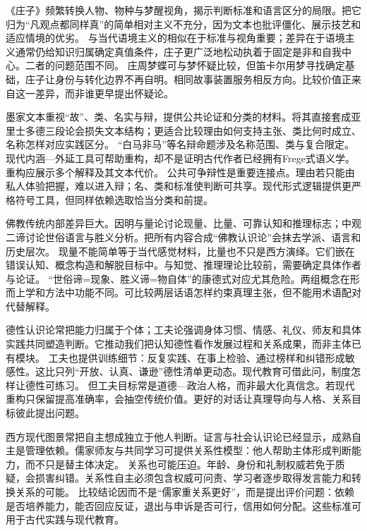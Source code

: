 《庄子》频繁转换人物、物种与梦醒视角，揭示判断标准和语言区分的局限\parencite{zhuangzi2009}。把它归为“凡观点都同样真”的简单相对主义不充分，因为文本也批评僵化、展示技艺和适应情境的优劣。 与当代语境主义的相似在于标准与视角重要；差异在于语境主义通常仍给知识归属确定真值条件，庄子更广泛地松动执着于固定是非和自我中心。二者的问题范围不同。 庄周梦蝶可与梦怀疑比较，但笛卡尔用梦寻找确定基础，庄子让身份与转化边界不再自明。相同故事装置服务相反方向。比较价值正来自这一差异，而非谁更早提出怀疑论。

墨家文本重视“故”、类、名实与辩，提供公共论证和分类的材料。将其直接套成亚里士多德三段论会损失文本结构；更适合比较理由如何支持主张、类比何时成立、名称怎样对应实践区分\parencite{graham1989}。 “白马非马”等名辩命题涉及名称范围、类与复合限定。现代内涵—外延工具可帮助重构，却不是证明古代作者已经拥有Frege式语义学。重构应展示多个解释及其文本代价。 公共可争辩性是重要连接点。理由若只能由私人体验把握，难以进入辩；名、类和标准使判断可共享。现代形式逻辑提供更严格符号工具，但同样依赖选取恰当分类和前提。

佛教传统内部差异巨大。因明与量论讨论现量、比量、可靠认知和推理标志；中观二谛讨论世俗语言与胜义分析。把所有内容合成“佛教认识论”会抹去学派、语言和历史层次\parencite{dunne2004,siderits2013}。 现量不能简单等于当代感觉材料，比量也不只是西方演绎。它们嵌在错误认知、概念构造和解脱目标中。与知觉、推理理论比较前，需要确定具体作者与论证。 “世俗谛=现象、胜义谛=物自体”的康德式对应尤其危险。两组概念在形而上学和方法中功能不同\parencite{siderits2013}。可比较两层话语怎样约束真理主张，但不能用术语配对代替解释。

德性认识论常把能力归属于个体；工夫论强调身体习惯、情感、礼仪、师友和具体实践共同塑造判断。它推动我们把认知德性看作发展过程和关系成果，而非主体已有模块。 工夫也提供训练细节：反复实践、在事上检验、通过榜样和纠错形成敏感性。这比只列“开放、认真、谦逊”德性清单更动态。现代教育可借此问，制度怎样让德性可练习。 但工夫目标常是道德—政治人格，而非最大化真信念。若现代重构只保留提高准确率，会抽空传统价值。更好的对话让真理导向与人格、关系目标彼此提出问题。

西方现代图景常把自主想成独立于他人判断。证言与社会认识论已经显示，成熟自主是管理依赖。儒家师友与共同学习可提供关系性模型：他人帮助主体形成判断能力，而不只是替主体决定。 关系也可能压迫。年龄、身份和礼制权威若免于质疑，会损害纠错。关系性自主必须包含权威可问责、学习者逐步取得发言能力和转换关系的可能。 比较结论因而不是“儒家重关系更好”，而是提出评价问题：依赖是否培养能力，能否回应反证，退出与申诉是否可行，信用如何分配。这些标准可用于古代实践与现代教育。

